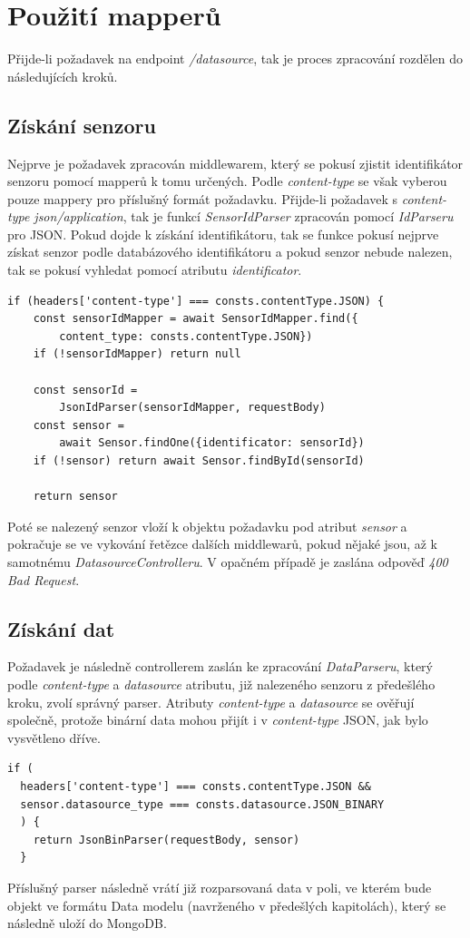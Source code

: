 \documentclass[thesis=M,czech]{FITthesis}[2018/10/20]
\begin{document}
\section{Použití mapperů}
Přijde-li požadavek na endpoint \textit{/datasource}, tak je proces zpracování rozdělen do následujících kroků. 
\subsection{Získání senzoru}
Nejprve je požadavek zpracován middlewarem, který se pokusí zjistit identifikátor senzoru pomocí mapperů k tomu určených. Podle \textit{content-type} se však vyberou pouze mappery pro příslušný formát požadavku. Přijde-li požadavek s \textit{content-type json/application}, tak je funkcí \textit{SensorIdParser} zpracován pomocí \textit{IdParseru} pro JSON. Pokud dojde k získání identifikátoru, tak se funkce pokusí nejprve získat senzor podle databázového identifikátoru a pokud senzor nebude nalezen, tak se pokusí vyhledat pomocí atributu \textit{identificator}.
\begin{lstlisting}
if (headers['content-type'] === consts.contentType.JSON) { 
    const sensorIdMapper = await SensorIdMapper.find({
        content_type: consts.contentType.JSON})  
    if (!sensorIdMapper) return null
         
    const sensorId = 
        JsonIdParser(sensorIdMapper, requestBody) 
    const sensor = 
        await Sensor.findOne({identificator: sensorId})   
    if (!sensor) return await Sensor.findById(sensorId)
  
    return sensor

\end{lstlisting}
Poté se nalezený senzor vloží k objektu požadavku pod atribut \textit{sensor} a pokračuje se ve vykování řetězce dalších middlewarů, pokud nějaké jsou, až k samotnému \textit{DatasourceControlleru}. V opačném případě je zaslána odpověď \textit{400 Bad Request}.
\subsection{Získání dat}
	Požadavek je následně controllerem zaslán ke zpracování \textit{DataParseru}, který podle \textit{content-type} a \textit{datasource} atributu, již nalezeného senzoru z předešlého kroku, zvolí správný parser. Atributy \textit{content-type} a \textit{datasource} se ověřují společně, protože binární data mohou přijít i v \textit{content-type} JSON, jak bylo vysvětleno dříve.
	\begin{lstlisting}
if (
  headers['content-type'] === consts.contentType.JSON &&
  sensor.datasource_type === consts.datasource.JSON_BINARY
  ) {
    return JsonBinParser(requestBody, sensor)
  }

\end{lstlisting}
Příslušný parser následně vrátí již rozparsovaná data v poli, ve kterém bude objekt ve formátu Data modelu (navrženého v předešlých kapitolách), který se následně uloží do MongoDB.
\end{document}

